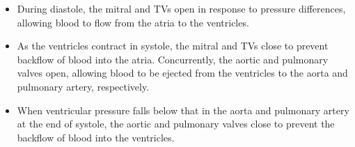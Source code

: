 \begin{itemize}
    \item During diastole, the mitral and \gls{TV}s open in response to pressure differences, allowing blood to flow from the atria to the ventricles.
    \item As the ventricles contract in systole, the mitral and \gls{TV}s close to prevent backflow of blood into the atria. Concurrently, the aortic and pulmonary valves open, allowing blood to be ejected from the ventricles to the aorta and pulmonary artery, respectively.
    \item When ventricular pressure falls below that in the aorta and pulmonary artery at the end of systole, the aortic and pulmonary valves close to prevent the backflow of blood into the ventricles.
\end{itemize}

